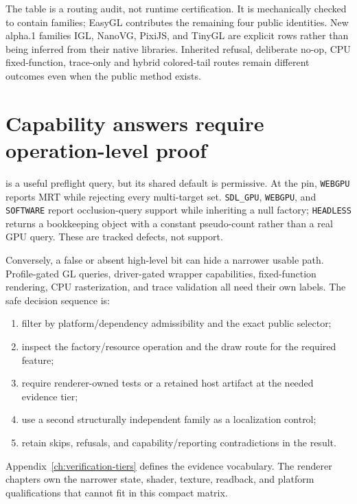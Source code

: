 The table is a routing audit, not runtime certification. It is mechanically checked to contain
\RendererFamilyCount{} families; EasyGL contributes the remaining four public identities. New
alpha.1 families IGL, NanoVG, PixiJS, and TinyGL are explicit rows rather than being inferred from
their native libraries. Inherited refusal, deliberate no-op, CPU fixed-function, trace-only and
hybrid colored-tail routes remain different outcomes even when the public method exists.

\section{Capability answers require operation-level proof}

 is a useful preflight query, but its shared default
is permissive. At the pin, \texttt{WEBGPU} reports MRT while rejecting every multi-target set.
\texttt{SDL\_GPU}, \texttt{WEBGPU}, and
\texttt{SOFTWARE} report occlusion-query support while inheriting a null factory; \texttt{HEADLESS}
returns a bookkeeping object with a constant pseudo-count rather than a real GPU query.  These are
tracked defects, not support.

Conversely, a false or absent high-level bit can hide a narrower usable path.  Profile-gated GL
queries, driver-gated wrapper capabilities, fixed-function rendering, CPU rasterization, and
trace validation all need their own labels.  The safe decision sequence is:

\begin{enumerate}
  \item filter by platform/dependency admissibility and the exact public selector;
  \item inspect the factory/resource operation and the draw route for the required feature;
  \item require renderer-owned tests or a retained host artifact at the needed evidence tier;
  \item use a second structurally independent family as a localization control;
  \item retain skips, refusals, and capability/reporting contradictions in the result.
\end{enumerate}

Appendix~\ref{ch:verification-tiers} defines the evidence vocabulary.  The renderer chapters own
the narrower state, shader, texture, readback, and platform qualifications that cannot fit in
this compact matrix.
